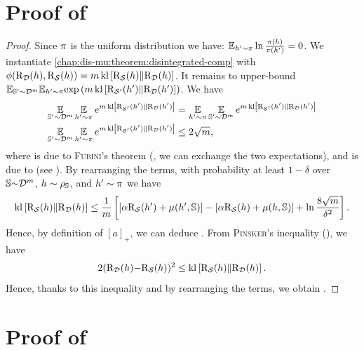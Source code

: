 \begin{noaddcontents}
\section{Proof of }
\label{ap:dis-mu:sec:proof-corollary-disintegrated-comp}

\corollaryboundcomplexitymeasure*
\begin{proof}
Since $\P$ is the uniform distribution we have: $\EE_{\h'\sim\P}\ln\frac{\P(\h)}{\P(\h')}=0$.  
We instantiate \cref{chap:dis-mu:theorem:disintegrated-comp} with $\phi(\Risk_{\D}(\h), \Risk_{\dS}(\h))=\m\kl\LB\Risk_{\dS}(\h) \|\Risk_{\D}(\h)\RB$.
It remains to upper-bound $\EE_{\S'\sim\D^\m}\!\EE_{\h'\sim\P}\!\exp\LP\m\kl\LB\Risk_{\dS'}(\h') \|\Risk_{\D}(\h')\RB\RP$. 
We have
\allowdisplaybreaks[4]
\begin{align}
     \EE_{\S'\sim\D^\m}\EE_{\h'\sim\P}e^{\m\kl\LB\Risk_{\dS'}(\h') \|\Risk_{\D}(\h')\RB}  &=  \EE_{\h'\sim\P}\EE_{\S'\sim\D^\m}e^{\m\kl\LB\Risk_{\dS'}(\h') \|\Risk_{\D}(\h')\RB}\label{chap:dis-mu:proof-eq-1}\\
    \EE_{\S'\sim\D^\m}\EE_{\h'\sim\P}e^{\m\kl\LB\Risk_{\dS'}(\h') \|\Risk_{\D}(\h')\RB}  &\leq 2\sqrt{\m}\label{chap:dis-mu:proof-eq-2},
\end{align}
where  is due to \textsc{Fubini}'s theorem (\ie, we can exchange the two expectations), and  is due to \citet{Maurer2004} (see ).
By rearranging the terms, with probability at least $1{-}\delta$ over $\S{\sim}\D^\m$, $\h\sim\AQ$, and $\h'\sim\P$ we have
\begin{align*}
    \kl\LB\Risk_{\dS}(\h) \|\Risk_{\D}(\h)\RB \le \frac{1}{\m}\LB \LB\alpha\Risk_{\dS}(\h{'})  + \comp(\h',\S)\RB - \LB\alpha\Risk_{\dS}(\h)+\comp(\h,\S)\RB + \ln\frac{8\sqrt{\m}}{\delta^2} \RB.
\end{align*}
Hence, by definition of $[a]_+$, we can deduce .
From \textsc{Pinsker}'s inequality (), we have
\begin{align*}
    2(\Risk_{\D}(\h){-}\Risk_{\dS}(\h))^2 \le \kl\LB\Risk_{\dS}(\h) \|\Risk_{\D}(\h)\RB.
\end{align*}
Hence, thanks to this inequality and by rearranging the terms, we obtain .
\end{proof}

\section{Proof of }
\label{ap:dis-mu:sec:proof-prop-disintegrated}


\end{noaddcontents}

